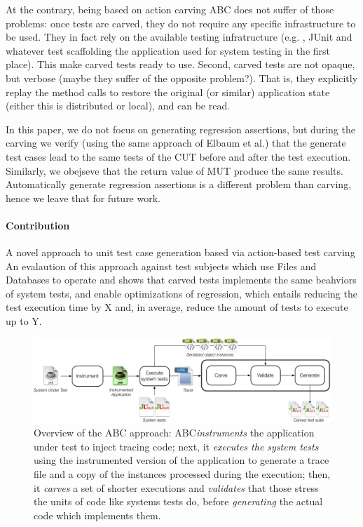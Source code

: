 \documentclass[10pt,conference]{IEEEtran}
\makeatletter
\gdef\xxx{\@ifnextchar[\xxx@lab\xxx@nolab}
\newcommand{\abc}{\textsf{ABC}\xspace}
\makeatother
\begin{document}
At the contrary,  being based on action carving \abc does not suffer of those problems: once tests are carved, they do not require any specific infrastructure to be used. They in fact rely on the available testing infratructure (e.g. , JUnit and whatever test scaffolding the application used for system testing in the first place). This make carved tests ready to use. Second, carved tests are not opaque, but verbose (maybe they suffer of the opposite problem?).
That is, they explicitly replay the method calls to restore the original (or similar) application state (either this is distributed or local), and can be read.

In this paper, we do not focus on generating regression assertions, but during the carving we verify (using the same approach of Elbaum et al.) that the generate test cases lead to the same tests of the CUT before and after the test execution. Similarly, we obejseve that the return value of MUT produce the same results. Automatically generate regression assertions is a different problem than carving, hence we leave that for future work.

\paragraph{Contribution}
A novel approach to unit test case generation based via action-based test carving
An evalaution of this approach against test subjects which use Files and Databases to operate and shows that carved tests
implements the same beahviors of system tests, and enable optimizations of regression, which entails reducing the test execution time by X and, in average, reduce the amount of tests to execute up to Y.


\begin{figure}[h!]
\centering
\includegraphics[width=\textwidth]{overview}
\caption{Overview of the \abc approach: \abc \emph{instruments} the application under test to inject tracing code; next, it \emph{executes the system tests} using the instrumented version of the application to generate a trace file and a copy of the instances processed during the execution; 
then, it \emph{carves} a set of shorter executions and \emph{validates} that those stress the units of code like systems tests
do, before \emph{generating} the actual code which implements them.
}
\label{fig:overview}
\end{figure}
\end{document}
